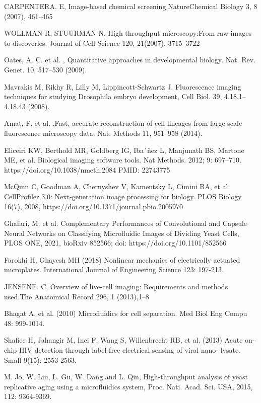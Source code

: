 \documentclass[conference]{IEEEtran}
\begin{document}
\begin{thebibliography}{00}

CARPENTERA. E, Image-based chemical screening.NatureChemical Biology 3, 8 (2007), 461–465

WOLLMAN R, STUURMAN  N, High throughput microscopy:From raw images to discoveries. Journal of Cell Science 120, 21(2007), 3715–3722

Oates, A. C. et al. , Quantitative approaches in developmental biology. Nat. Rev. Genet. 10, 517–530 (2009).


Mavrakis M, Rikhy R, Lilly M, Lippincott-Schwartz J, Fluorescence imaging techniques for studying Drosophila embryo development, Cell Biol. 39, 4.18.1–4.18.43 (2008).


Amat, F. et al. ,Fast, accurate reconstruction of cell lineages from large-scale fluorescence microscopy data. Nat. Methods 11, 951–958 (2014).


Eliceiri KW, Berthold MR, Goldberg IG, Iba´ñez L, Manjunath BS, Martone ME, et al. Biological imaging software tools. Nat Methods. 2012; 9: 697–710. https://doi.org/10.1038/nmeth.2084 PMID: 22743775

McQuin C, Goodman A, Chernyshev V, Kamentsky L, Cimini BA, et al. CellProfiler 3.0: Next-generation image processing for biology. PLOS Biology 16(7), 2008, https://doi.org/10.1371/journal.pbio.2005970

Ghafari, M. et al. Complementary Performances of Convolutional and Capsule Neural Networks on Classifying Microfluidic Images of Dividing Yeast Cells, PLOS ONE, 2021, bioRxiv 852566; doi: https://doi.org/10.1101/852566

Farokhi H, Ghayesh MH (2018) Nonlinear mechanics of electrically actuated microplates. International Journal of Engineering Science 123: 197-213.

JENSENE. C, Overview of live-cell imaging: Requirements and methods used.The Anatomical Record 296, 1 (2013),1–8


 Bhagat A. et al. (2010) Microfluidics for cell separation. Med Biol Eng Compu 48: 999-1014.

Shafiee H, Jahangir M, Inci F, Wang S, Willenbrecht RB, et al. (2013) Acute on-chip HIV detection through label-free electrical sensing of viral nano- lysate. Small 9(15): 2553-2563.

M. Jo, W. Liu, L. Gu, W. Dang and  L. Qin, High-throughput analysis of yeast replicative aging using a microfluidics system, Proc. Nati. Acad. Sci. USA, 2015, 112: 9364-9369.


\end{thebibliography}
\end{document}
